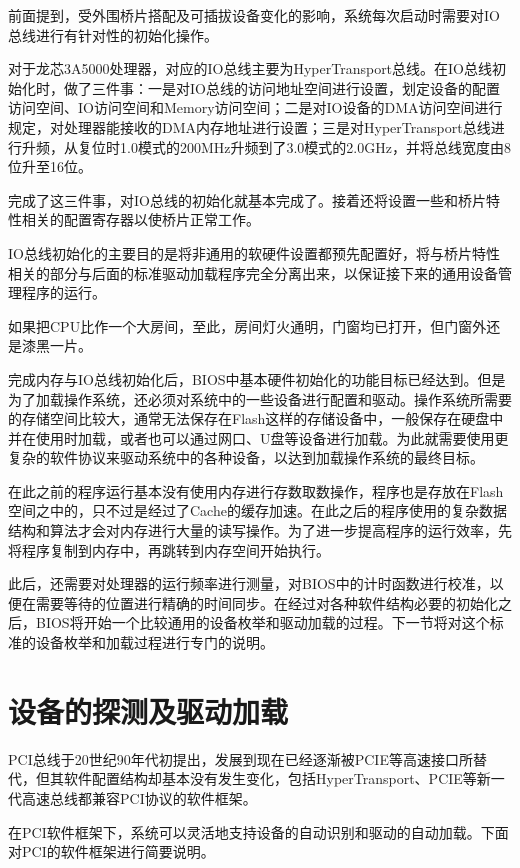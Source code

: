 \documentclass[]{ctexbook}
\begin{document}
前面提到，受外围桥片搭配及可插拔设备变化的影响，系统每次启动时需要对IO总线进行有针对性的初始化操作。

对于龙芯3A5000处理器，对应的IO总线主要为HyperTransport总线。在IO总线初始化时，做了三件事：一是对IO总线的访问地址空间进行设置，划定设备的配置访问空间、IO访问空间和Memory访问空间；二是对IO设备的DMA访问空间进行规定，对处理器能接收的DMA内存地址进行设置；三是对HyperTransport总线进行升频，从复位时1.0模式的200MHz升频到了3.0模式的2.0GHz，并将总线宽度由8位升至16位。

完成了这三件事，对IO总线的初始化就基本完成了。接着还将设置一些和桥片特性相关的配置寄存器以使桥片正常工作。

IO总线初始化的主要目的是将非通用的软硬件设置都预先配置好，将与桥片特性相关的部分与后面的标准驱动加载程序完全分离出来，以保证接下来的通用设备管理程序的运行。

如果把CPU比作一个大房间，至此，房间灯火通明，门窗均已打开，但门窗外还是漆黑一片。

完成内存与IO总线初始化后，BIOS中基本硬件初始化的功能目标已经达到。但是为了加载操作系统，还必须对系统中的一些设备进行配置和驱动。操作系统所需要的存储空间比较大，通常无法保存在Flash这样的存储设备中，一般保存在硬盘中并在使用时加载，或者也可以通过网口、U盘等设备进行加载。为此就需要使用更复杂的软件协议来驱动系统中的各种设备，以达到加载操作系统的最终目标。

在此之前的程序运行基本没有使用内存进行存数取数操作，程序也是存放在Flash空间之中的，只不过是经过了Cache的缓存加速。在此之后的程序使用的复杂数据结构和算法才会对内存进行大量的读写操作。为了进一步提高程序的运行效率，先将程序复制到内存中，再跳转到内存空间开始执行。

此后，还需要对处理器的运行频率进行测量，对BIOS中的计时函数进行校准，以便在需要等待的位置进行精确的时间同步。在经过对各种软件结构必要的初始化之后，BIOS将开始一个比较通用的设备枚举和驱动加载的过程。下一节将对这个标准的设备枚举和加载过程进行专门的说明。

\hypertarget{ux8bbeux5907ux7684ux63a2ux6d4bux53caux9a71ux52a8ux52a0ux8f7d}{%
\section{设备的探测及驱动加载}\label{ux8bbeux5907ux7684ux63a2ux6d4bux53caux9a71ux52a8ux52a0ux8f7d}}

PCI总线于20世纪90年代初提出，发展到现在已经逐渐被PCIE等高速接口所替代，但其软件配置结构却基本没有发生变化，包括HyperTransport、PCIE等新一代高速总线都兼容PCI协议的软件框架。

在PCI软件框架下，系统可以灵活地支持设备的自动识别和驱动的自动加载。下面对PCI的软件框架进行简要说明。
\end{document}

